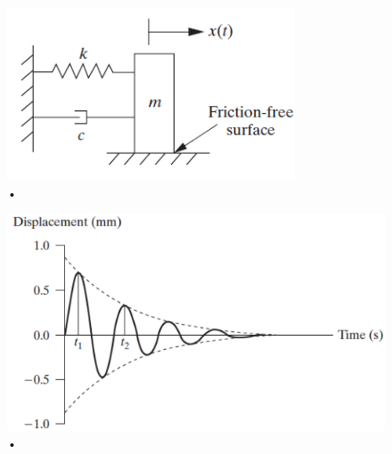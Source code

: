 \documentclass[a4paper,11pt,dvipsnames]{book}
\begin{document}
\begin{figure}[h!]
\centering
\includegraphics[width=0.3\linewidth]{q4a} 
\caption{•}
\end{figure}

\begin{figure}[h!]
\centering
\includegraphics[width=0.5\linewidth]{q4b} 
\caption{•}
\end{figure}
\end{document}
